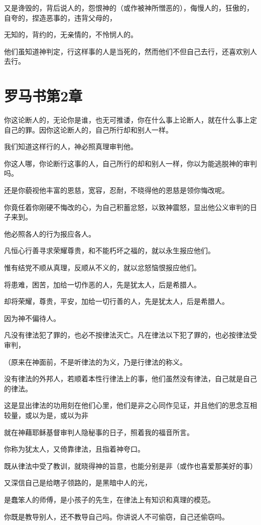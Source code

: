 \documentclass[12pt,oneside]{book}
\begin{document}
又是谗毁的，背后说人的，怨恨神的（或作被神所憎恶的），侮慢人的，狂傲的，自夸的，捏造恶事的，违背父母的，

无知的，背约的，无亲情的，不怜悯人的。

他们虽知道神判定，行这样事的人是当死的，然而他们不但自己去行，还喜欢别人去行。

\chapter{罗马书第2章}
你这论断人的，无论你是谁，也无可推诿，你在什么事上论断人，就在什么事上定自己的罪。因你这论断人的，自己所行却和别人一样。

我们知道这样行的人，神必照真理审判他。

你这人哪，你论断行这事的人，自己所行的却和别人一样，你以为能逃脱神的审判吗。

还是你藐视他丰富的恩慈，宽容，忍耐，不晓得他的恩慈是领你悔改呢。

你竟任着你刚硬不悔改的心，为自己积蓄忿怒，以致神震怒，显出他公义审判的日子来到。

他必照各人的行为报应各人。

凡恒心行善寻求荣耀尊贵，和不能朽坏之福的，就以永生报应他们。

惟有结党不顺从真理，反顺从不义的，就以忿怒恼恨报应他们。

将患难，困苦，加给一切作恶的人，先是犹太人，后是希腊人。

却将荣耀，尊贵，平安，加给一切行善的人，先是犹太人，后是希腊人。

因为神不偏待人。

凡没有律法犯了罪的，也必不按律法灭亡。凡在律法以下犯了罪的，也必按律法受审判，

（原来在神面前，不是听律法的为义，乃是行律法的称义。

没有律法的外邦人，若顺着本性行律法上的事，他们虽然没有律法，自己就是自己的律法。

这是显出律法的功用刻在他们心里，他们是非之心同作见证，并且他们的思念互相较量，或以为是，或以为非

就在神藉耶稣基督审判人隐秘事的日子，照着我的福音所言。

你称为犹太人，又倚靠律法，且指着神夸口。

既从律法中受了教训，就晓得神的旨意，也能分别是非（或作也喜爱那美好的事）

又深信自己是给瞎子领路的，是黑暗中人的光，

是蠢笨人的师傅，是小孩子的先生，在律法上有知识和真理的模范。

你既是教导别人，还不教导自己吗。你讲说人不可偷窃，自己还偷窃吗。
\end{document}
